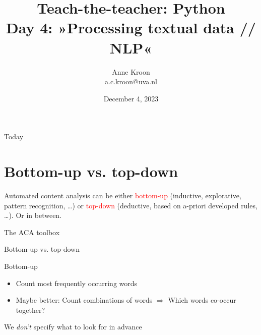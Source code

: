 \documentclass[compress]{beamer}
\title[Teach-the-teacher: Python]{\textbf{Teach-the-teacher: Python} 
\\Day 4: »Processing textual data // NLP« }
\author[Anne Kroon]{Anne Kroon\\ \footnotesize{a.c.kroon@uva.nl}}
\date{December 4, 2023}
\institute[UvA CW]{UvA RM Communication Science}
\begin{document}
	
	\begin{frame}{}
		\titlepage{\tiny }
	\end{frame}
	
	\begin{frame}{Today}
		\tableofcontents
	\end{frame}


\section{Bottom-up vs. top-down}

\begin{frame}[standout]
Automated content analysis can be either \textcolor{red}{bottom-up} (inductive, explorative, pattern recognition, \ldots) or \textcolor{red}{top-down} (deductive, based on a-priori developed rules, \ldots). Or in between.
\end{frame}


\begin{frame}{The ACA toolbox}
\\
\cite{Boumans2016}
\end{frame}


\begin{frame}{Bottom-up vs. top-down}
\begin{block}{Bottom-up}
\begin{itemize}
\item Count most frequently occurring words 
\item Maybe better: Count combinations of words $\Rightarrow$ Which words co-occur together?
\end{itemize}
We \emph{don't} specify what to look for in advance	
\end{block}

\end{frame}
\end{document}
